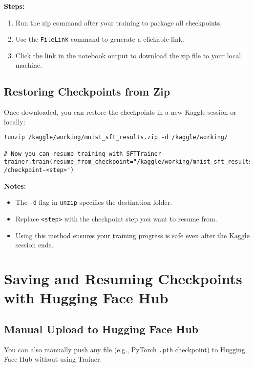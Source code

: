 \textbf{Steps:}
\begin{enumerate}
    \item Run the zip command after your training to package all checkpoints.
    \item Use the \texttt{FileLink} command to generate a clickable link.
    \item Click the link in the notebook output to download the zip file to your local machine.
\end{enumerate}

\subsection{Restoring Checkpoints from Zip}

Once downloaded, you can restore the checkpoints in a new Kaggle session or locally:

\begin{tcolorbox}[colback=blue!5!white, colframe=blue!75!black, title=Restore Example]
\begin{verbatim}
!unzip /kaggle/working/mnist_sft_results.zip -d /kaggle/working/

# Now you can resume training with SFTTrainer
trainer.train(resume_from_checkpoint="/kaggle/working/mnist_sft_results
/checkpoint-<step>")
\end{verbatim}
\end{tcolorbox}

\textbf{Notes:}
\begin{itemize}
    \item The \texttt{-d} flag in \texttt{unzip} specifies the destination folder.
    \item Replace \texttt{<step>} with the checkpoint step you want to resume from.
    \item Using this method ensures your training progress is safe even after the Kaggle session ends.
\end{itemize}

\newpage
\section{Saving and Resuming Checkpoints with Hugging Face Hub}
\subsection{Manual Upload to Hugging Face Hub}
You can also manually push any file (e.g., PyTorch \texttt{.pth} checkpoint) to Hugging Face Hub without using Trainer.

